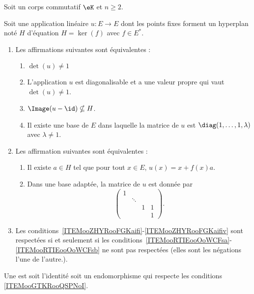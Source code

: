 Soit un corps commutatif \( \eK\) et \( n\geq 2\).

\begin{theoremDef}     \label{ThoooAZKDooNDcznv}
	Soit une application linéaire \( u\colon E\to E\) dont les points fixes forment un hyperplan noté \( H\) d'équation \( H=\ker(f)\) avec \( f\in E^*\).
	\begin{enumerate}
		\item     \label{ITEMooGTKRooQSPNoI}
		      Les affirmations suivantes sont équivalentes :
		      \begin{enumerate}
			      \item  \label{ITEMooZHYRooFGKaifi}
			            \( \det(u)\neq 1\)
			      \item       \label{ooXKLWooTfUMzV}
			            L'application \( u\) est diagonalisable et a une valeur propre qui vaut \( \det(u)\neq 1\).
			      \item       \label{ooMZPTooCLylbh}
			            \( \Image(u-\id)\nsubseteq H\).
			      \item   \label{ITEMooZHYRooFGKaifiv}
			            Il existe une base de \( E\) dans laquelle la matrice de \( u\) est \( \diag(1,\ldots, 1,\lambda)\) avec \( \lambda\neq 1\).
		      \end{enumerate}
		\item       \label{ITEMooMSJXooUsLCHx}
		      Les affirmation suivantes sont équivalentes :
		      \let\oldthenumii\theenumi
		      \renewcommand{\theenumii}{\roman{enumii}}
		      \begin{enumerate}
			      \item       \label{ITEMooRTIEooOoWCFsa}
			            Il existe \( a\in H\) tel que pour tout \( x\in E\), \( u(x)=x+f(x)a\).
			      \item       \label{ITEMooRTIEooOoWCFsb}
			            Dans une base adaptée, la matrice de \( u\) est donnée par
			            \begin{equation}        \label{EQooFXBDooTgZwMv}
				            \begin{pmatrix}
					            1 &        &   &   \\
					              & \ddots &   &   \\
					              &        & 1 & 1 \\
					              &        &   & 1
				            \end{pmatrix}.
			            \end{equation}
		      \end{enumerate}
		      \let\theenumii\oldtheenumii
		\item
		      Les conditions~\ref{ITEMooZHYRooFGKaifi}-\ref{ITEMooZHYRooFGKaifiv} sont respectées si et seulement si les conditions~\ref{ITEMooRTIEooOoWCFsa}-\ref{ITEMooRTIEooOoWCFsb} ne sont pas respectées (elles sont les négations l'une de l'autre.).
	\end{enumerate}
	Une  est soit l'identité soit un endomorphisme qui respecte les conditions \ref{ITEMooGTKRooQSPNoI}.


\end{theoremDef}

